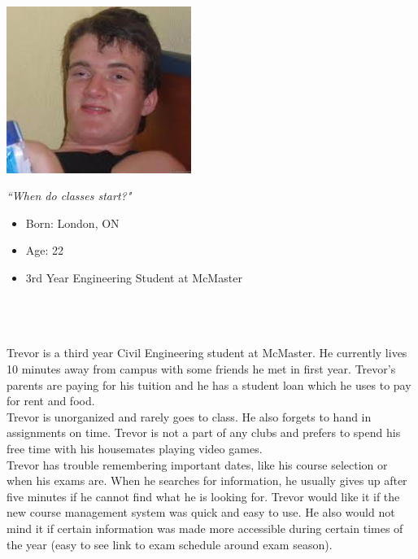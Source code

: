 \documentclass[10pt]{article}
\begin{document}
\begin{minipage}{60mm}
\includegraphics[width=60mm]{Trevor.jpg}
\begin{center}
\emph{``When do classes start?"}
\end{center}
\end{minipage}
\begin{minipage}{\textwidth}
\begin{itemize}
\item Born: London, ON
\item Age: 22
\item 3rd Year Engineering Student at McMaster
\end{itemize}
\end{minipage}\\\\\\

Trevor is a third year Civil Engineering student at McMaster. He currently lives 10 minutes away from campus with some friends he met in first year. Trevor's parents are paying for his tuition and he has a student loan which he uses to pay for rent and food.\\

Trevor is unorganized and rarely goes to class. He also forgets to hand in assignments on time. Trevor is not a part of any clubs and prefers to spend his free time with his housemates playing video games.\\

Trevor has trouble remembering important dates, like his course selection or when his exams are. When he searches for information, he usually gives up after five minutes if he cannot find what he is looking for. Trevor would like it if the new course management system was quick and easy to use. He also would not mind it if certain information was made more accessible during certain times of the year (easy to see link to exam schedule around exam season).

\end{document}
